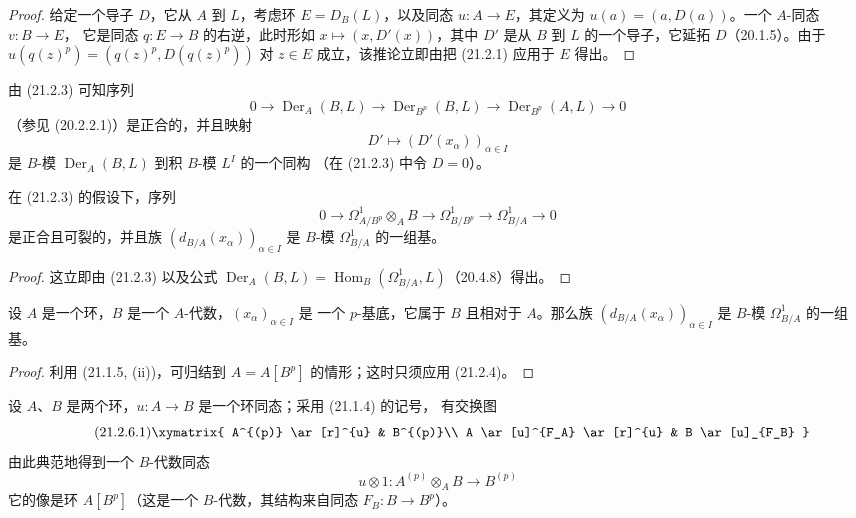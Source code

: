 \begin{proof}
给定一个导子 $D$，它从 $A$ 到 $L$，考虑环 $E=D_B(L)$，以及同态
$u:A\to E$，其定义为 $u(a)=(a,D(a))$。一个 $A$-同态 $v:B\to E$，
它是同态 $q:E\to B$ 的右逆，此时形如 $x\mapsto(x,D'(x))$，其中 $D'$ 是从
$B$ 到 $L$ 的一个导子，它延拓 $D$（20.1.5）。由于
$u(q(z)^p)=(q(z)^p,D(q(z)^p))$ 对 $z\in E$ 成立，该推论立即由把
(21.2.1) 应用于 $E$ 得出。
\end{proof}

由 (21.2.3) 可知序列
\begin{equation}
\tag{21.2.3.1}
\label{0.21.2.3.1-fr}
0\to\operatorname{Der}_A(B,L)\to\operatorname{Der}_{B^p}(B,L)
\to\operatorname{Der}_{B^p}(A,L)\to0
\end{equation}
（参见 (20.2.2.1)）是正合的，并且映射
\begin{equation}
\tag{21.2.3.2}
\label{0.21.2.3.2-fr}
D'\longmapsto(D'(x_\alpha))_{\alpha\in I}
\end{equation}
是 $B$-模 $\operatorname{Der}_A(B,L)$ 到积 $B$-模 $L^I$ 的一个同构
（在 (21.2.3) 中令 $D=0$）。

\begin{corollary}[21.2.4]
\label{0.21.2.4-fr}
在 (21.2.3) 的假设下，序列
\begin{equation}
\tag{21.2.4.1}
\label{0.21.2.4.1-fr}
0\to\Omega^1_{A/B^p}\otimes_A B\to\Omega^1_{B/B^p}
\to\Omega^1_{B/A}\to0
\end{equation}
是正合且可裂的，并且族 $(d_{B/A}(x_\alpha))_{\alpha\in I}$ 是 $B$-模
$\Omega^1_{B/A}$ 的一组基。
\end{corollary}

\begin{proof}
这立即由 (21.2.3) 以及公式
$\operatorname{Der}_A(B,L)=\operatorname{Hom}_B(\Omega^1_{B/A},L)$（20.4.8）得出。
\end{proof}

\begin{corollary}[21.2.5]
\label{0.21.2.5-fr}
设 $A$ 是一个环，$B$ 是一个 $A$-代数，$(x_\alpha)_{\alpha\in I}$ 是
一个 $p$-基底，它属于 $B$ 且相对于 $A$。那么族 $(d_{B/A}(x_\alpha))_{\alpha\in I}$
是 $B$-模 $\Omega^1_{B/A}$ 的一组基。
\end{corollary}

\begin{proof}
利用 (21.1.5, (ii))，可归结到 $A=A[B^p]$ 的情形；这时只须应用 (21.2.4)。
\end{proof}

\begin{env}[21.2.6]
\label{0.21.2.6-fr}
设 $A$、$B$ 是两个环，$u:A\to B$ 是一个环同态；采用 (21.1.4) 的记号，
有交换图
\begin{equation}
\tag{21.2.6.1}
\label{0.21.2.6.1-fr}
\xymatrix{
 A^{(p)} \ar[r]^{u} & B^{(p)}\\
 A \ar[u]^{F_A} \ar[r]^{u} & B \ar[u]_{F_B}
}
\end{equation}
由此典范地得到一个 $B$-代数同态
\begin{equation}
\tag{21.2.6.2}
\label{0.21.2.6.2-fr}
u\otimes1:A^{(p)}\otimes_A B\longrightarrow B^{(p)}
\end{equation}
它的像是环 $A[B^p]$（这是一个 $B$-代数，其结构来自同态 $F_B:B\to B^p$）。
\end{env}

